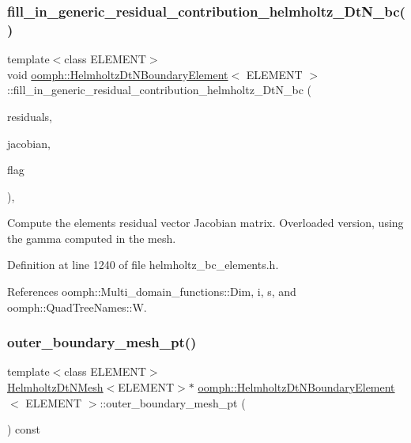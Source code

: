 \subsubsection{\texorpdfstring{fill\+\_\+in\+\_\+generic\+\_\+residual\+\_\+contribution\+\_\+helmholtz\+\_\+\+Dt\+N\+\_\+bc()}{fill\_in\_generic\_residual\_contribution\_helmholtz\_DtN\_bc()}}
{\footnotesize\ttfamily template$<$class E\+L\+E\+M\+E\+NT$>$ \\
void \hyperlink{classoomph_1_1HelmholtzDtNBoundaryElement}{oomph\+::\+Helmholtz\+Dt\+N\+Boundary\+Element}$<$ E\+L\+E\+M\+E\+NT $>$\+::fill\+\_\+in\+\_\+generic\+\_\+residual\+\_\+contribution\+\_\+helmholtz\+\_\+\+Dt\+N\+\_\+bc (\begin{DoxyParamCaption}\item[{\hyperlink{classoomph_1_1Vector}{Vector}$<$ double $>$ \&}]{residuals,  }\item[{\hyperlink{classoomph_1_1DenseMatrix}{Dense\+Matrix}$<$ double $>$ \&}]{jacobian,  }\item[{const unsigned \&}]{flag }\end{DoxyParamCaption})\hspace{0.3cm}{\ttfamily [inline]}, {\ttfamily [private]}}



Compute the element\textquotesingle{}s residual vector Jacobian matrix. Overloaded version, using the gamma computed in the mesh. 



Definition at line 1240 of file helmholtz\+\_\+bc\+\_\+elements.\+h.



References oomph\+::\+Multi\+\_\+domain\+\_\+functions\+::\+Dim, i, s, and oomph\+::\+Quad\+Tree\+Names\+::W.

\mbox{\label{classoomph_1_1HelmholtzDtNBoundaryElement_a28b795a0c330435e1132a6e0694916cf}} 
\subsubsection{\texorpdfstring{outer\+\_\+boundary\+\_\+mesh\+\_\+pt()}{outer\_boundary\_mesh\_pt()}}
{\footnotesize\ttfamily template$<$class E\+L\+E\+M\+E\+NT$>$ \\
\hyperlink{classoomph_1_1HelmholtzDtNMesh}{Helmholtz\+Dt\+N\+Mesh}$<$E\+L\+E\+M\+E\+NT$>$$\ast$ \hyperlink{classoomph_1_1HelmholtzDtNBoundaryElement}{oomph\+::\+Helmholtz\+Dt\+N\+Boundary\+Element}$<$ E\+L\+E\+M\+E\+NT $>$\+::outer\+\_\+boundary\+\_\+mesh\+\_\+pt (\begin{DoxyParamCaption}{ }\end{DoxyParamCaption}) const\hspace{0.3cm}{\ttfamily [inline]}}



